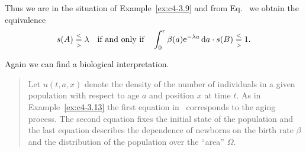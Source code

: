 \begin{example}
Thus we are in the situation of Example~\ref{ex:c4-3.9} and from Eq.~ we obtain the equivalence
\[
s(A) \overset{<}{ \underset{>}{=} } \lambda \quad \text{if and only if} \quad \int_{0}^{r} \beta(a)\mathrm{e}^{-\lambda a} \mathop{}\!\mathrm{d}{a} \cdot s(B) \overset{<}{ \underset{>}{=} } 1 .
\]
\end{example}
Again we can find a biological interpretation.
\begin{quote}
Let $u(t,a,x)$ denote the density of the number of individuals in a given population with respect to age $a$ and position $x$ at time $t$.
As in Example~\ref{ex:c4-3.13} the first equation in~ corresponds to the aging process.
The second equation fixes the initial state of the population and the last equation describes the dependence of newborns on the birth rate $\beta$ and the distribution of the population over the \enquote{area} $\Omega$. 
\end{quote}
